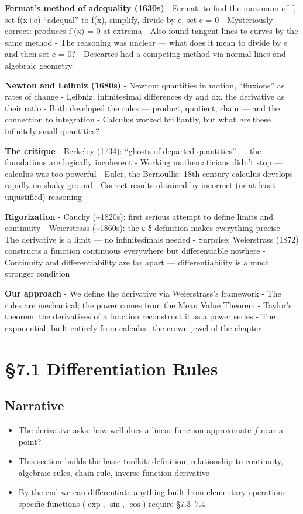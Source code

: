 \documentclass[
  10pt,
  letterpaper,
]{scrbook}
\providecommand{\tightlist}{%
  \setlength{\itemsep}{0pt}\setlength{\parskip}{0pt}}
\begin{document}
\textbf{Fermat's method of adequality (1630s)} - Fermat: to find the
maximum of f, set f(x+e) ``adequal'' to f(x), simplify, divide by e, set
e = 0 - Mysteriously correct: produces f'(x) = 0 at extrema - Also found
tangent lines to curves by the same method - The reasoning was unclear
--- what does it mean to divide by e and then set e = 0? - Descartes had
a competing method via normal lines and algebraic geometry

\textbf{Newton and Leibniz (1680s)} - Newton: quantities in motion,
``fluxions'' as rates of change - Leibniz: infinitesimal differences dy
and dx, the derivative as their ratio - Both developed the rules ---
product, quotient, chain --- and the connection to integration -
Calculus worked brilliantly, but what \emph{are} these infinitely small
quantities?

\textbf{The critique} - Berkeley (1734): ``ghosts of departed
quantities'' --- the foundations are logically incoherent - Working
mathematicians didn't stop --- calculus was too powerful - Euler, the
Bernoullis: 18th century calculus develops rapidly on shaky ground -
Correct results obtained by incorrect (or at least unjustified)
reasoning

\textbf{Rigorization} - Cauchy (\textasciitilde1820s): first serious
attempt to define limits and continuity - Weierstrass
(\textasciitilde1860s): the ε-δ definition makes everything precise -
The derivative is a limit --- no infinitesimals needed - Surprise:
Weierstrass (1872) constructs a function continuous everywhere but
differentiable nowhere - Continuity and differentiability are far apart
--- differentiability is a much stronger condition

\textbf{Our approach} - We define the derivative via Weierstrass's
framework - The rules are mechanical; the power comes from the Mean
Value Theorem - Taylor's theorem: the derivatives of a function
reconstruct it as a power series - The exponential: built entirely from
calculus, the crown jewel of the chapter

\section{§7.1 Differentiation Rules}\label{differentiation-rules}

\subsection{Narrative}\label{narrative-29}

\begin{itemize}
\tightlist
\item
  The derivative asks: how well does a linear function approximate \(f\)
  near a point?
\item
  This section builds the basic toolkit: definition, relationship to
  continuity, algebraic rules, chain rule, inverse function derivative
\item
  By the end we can differentiate anything built from elementary
  operations --- specific functions (\(\exp\), \(\sin\), \(\cos\))
  require §7.3--7.4
\end{itemize}
\end{document}
